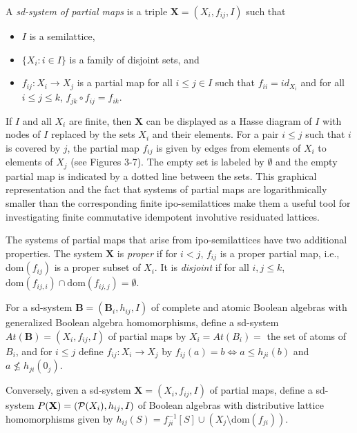 \documentclass[12pt]{amsart}
\newcommand{\m}{\mathbf} %
\begin{document}
A \emph{sd-system of partial maps} is a triple $\m X=(X_i,f_{ij},I)$ such that
\begin{itemize}
\item $I$ is a semilattice,
\item $\{X_i:i\in I\}$ is a family of disjoint sets, and
\item $f_{ij}: X_i\to X_j$ is a partial map for all $i\le j\in I$ such that $f_{ii}=id_{X_i}$ and for all $i\le j\le k$, $f_{jk}\circ f_{ij}=f_{ik}$.
\end{itemize}

If $I$ and all $X_i$ are finite, then $\m X$ can be displayed as a Hasse diagram of $I$ with
nodes of $I$ replaced by the sets $X_i$ and their elements. For a pair $i\le j$ such that $i$ is covered by $j$, the partial map $f_{ij}$ is given by edges from elements of $X_i$ to elements of $X_j$ (see Figures 3-7). The empty set is labeled by $\emptyset$ and the empty partial map is indicated by a dotted line between the sets. This graphical representation and the fact that
systems of partial maps are logarithmically smaller than the corresponding finite ipo-semilattices
make them a useful tool for investigating finite commutative idempotent involutive residuated lattices.

The systems of partial maps that arise from ipo-semilattices have two additional properties.
The system $\m X$ is \emph{proper} if for $i<j$, $f_{ij}$ is a proper partial map, i.e., dom$(f_{ij})$ is a proper subset of $X_i$. It is \emph{disjoint} if for all $i,j\le k$, $\text{dom}(f_{ij,i})\cap\text{dom}(f_{ij,j})=\emptyset$.

For a sd-system $\m B=(\m B_i,h_{ij},I)$ of complete and atomic Boolean algebras with generalized Boolean algebra homomorphisms, define a sd-system $At(\m B)=(X_i,f_{ij},I)$ of partial maps by $X_i=At(B_i)=$ the set of atoms of $B_i$, and for $i\le j$ define $f_{ij}:X_i\to X_j$ by $f_{ij}(a)=b\iff a\le h_{ji}(b)$ and $a\nleq h_{ji}(0_j)$.

Conversely, given a sd-system $\m X=(X_i,f_{ij},I)$ of partial maps, define a sd-system $\m \mathcal P(\m X)=(\mathcal P(X_i),h_{ij},I)$ of Boolean algebras with distributive lattice homomorphisms given by $h_{ij}(S)=f_{ji}^{-1}[S]\cup(X_j\setminus \text{dom}(f_{ji}))$.
\end{document}
